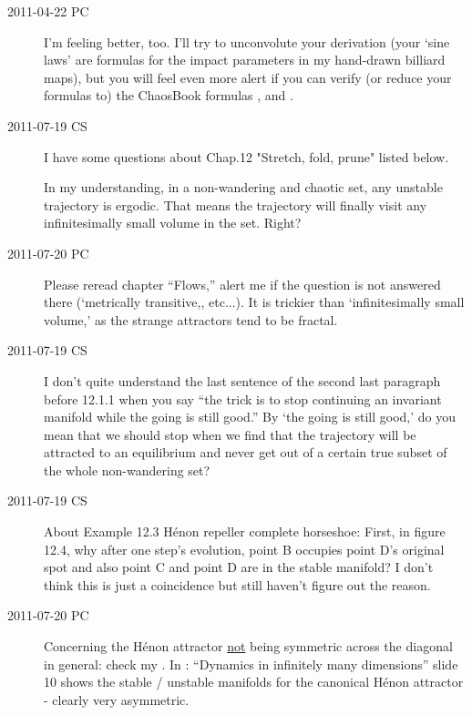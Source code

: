 \begin{description}
\item[2011-04-22 PC]
I'm feeling better, too. I'll try to unconvolute your derivation (your
`sine laws' are formulas for the impact parameters in my hand-drawn
billiard maps), but you will feel even more alert if you can
verify (or reduce your formulas to) the ChaosBook formulas
,  and .

\item[2011-07-19 CS]
I have some questions about Chap.12 "Stretch, fold, prune" listed below.

In my understanding, in a non-wandering and chaotic set, any unstable
trajectory is ergodic. That means the trajectory will finally visit any
infinitesimally small volume in the set. Right?

\item[2011-07-20 PC]                                        \toCB
Please reread chapter ``Flows,'' alert me if the question is not answered
there (`metrically transitive,, etc...). It is trickier than
`infinitesimally small volume,' as the strange attractors tend to be
fractal.

\item[2011-07-19 CS]
I don't quite understand the last sentence of the second last paragraph
before 12.1.1 when you say ``the trick is to stop continuing an invariant
manifold while the going is still good.'' By `the going is still good,' do
you mean that we should stop when we find that the trajectory will be
attracted to an equilibrium and never get out of a certain true subset of
the whole non-wandering set?

\item[2011-07-19 CS]
About Example 12.3 H\'enon repeller complete horseshoe:
First, in figure 12.4, why after one step's evolution, point B occupies
point D's original spot and also point C and point D are in the stable
manifold? I don't think this is just a coincidence but still haven't
figure out the reason.

\item[2011-07-20 PC]                                        \toCB
Concerning the H\'enon attractor \underline{not} being symmetric across
the diagonal in general: check my
.
In : ``Dynamics in infinitely many dimensions'' slide 10 shows the
stable / unstable manifolds for the canonical H\'enon attractor - clearly
very asymmetric.


\end{description}

